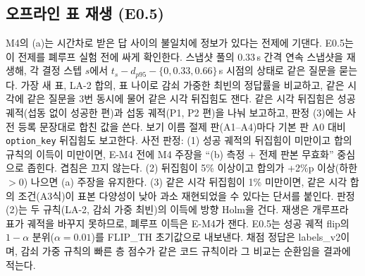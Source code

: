 \subsection{오프라인 표 재생 (E0.5)}
M4의 (a)는 시간차로 받은 답 사이의 불일치에 정보가 있다는 전제에 기댄다. E0.5는 이 전제를 폐루프 실험 전에 싸게 확인한다. 스냅샷 풀의 0.33\,s 간격 연속 스냅샷을 재생해, 각 결정 스텝 $s$에서 $t_s-d_{p95}-\{0,0.33,0.66\}$\,s 시점의 상태로 같은 질문을 묻는다. 가장 새 표, LA-2 합의, 표 나이로 감쇠 가중한 최빈의 정답률을 비교하고, 같은 시각에 같은 질문을 3번 동시에 물어 같은 시각 뒤집힘도 잰다. 같은 시각 뒤집힘은 성공 궤적(섭동 없이 성공한 편)과 섭동 궤적(P1, P2 편)을 나눠 보고하고, 판정 (3)에는 사전 등록 문장대로 합친 값을 쓴다. 보기 이름 절제 판(A1--A4)마다 기본 판 A0 대비 \texttt{option\_key} 뒤집힘도 보고한다. 사전 판정: (1) 성공 궤적의 뒤집힘이  미만이고 합의 규칙의 이득이  미만이면, E-M4 전에 M4 주장을 ``(b) 측정 + 전제 판본 무효화'' 중심으로 좁힌다. 겹침은 끄지 않는다. (2) 뒤집힘이 5\% 이상이고 합의가 +2\%p 이상(하한 $>0$) 나으면 (a) 주장을 유지한다. (3) 같은 시각 뒤집힘이 1\% 미만이면, 같은 시각 합의 조건(A3식)이 표본 다양성이 낮아 과소 재현되었을 수 있다는 단서를 붙인다. 판정 (2)는 두 규칙(LA-2, 감쇠 가중 최빈)의 이득에 방향 Holm을 건다. 재생은 개루프라 표가 궤적을 바꾸지 못하므로, 폐루프 이득은 E-M4가 잰다. E0.5는 성공 궤적 flip의 $1-\alpha$ 분위($\alpha=0.01$)를 FLIP\_TH 초기값으로 내보낸다. 채점 정답은 labels\_v2이며, 감쇠 가중 규칙의 빠른 층 점수가 같은 코드 규칙이라 그 비교는 순환임을 결과에 적는다.

